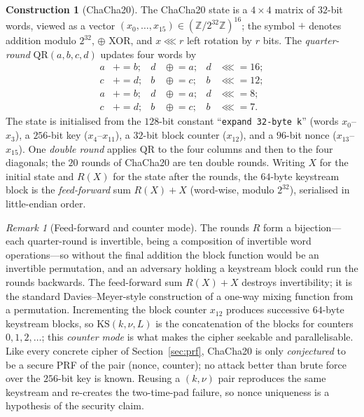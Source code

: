 \documentclass[11pt,a4paper]{article}
\theoremstyle{definition}
\newtheorem{construction}[theorem]{Construction}
\theoremstyle{remark}
\newtheorem{remark}[theorem]{Remark}
\newcommand{\Z}{\ensuremath{\mathbb{Z}}}
\begin{document}
\begin{construction}[ChaCha20]\label{symmetric:con-chacha}
The \textsf{ChaCha20} state is a \(4 \times 4\) matrix of \(32\)-bit
words, viewed as a vector
\((x_{0}, \dots, x_{15}) \in (\Z/2^{32}\Z)^{16}\); the symbol \(+\)
denotes addition modulo \(2^{32}\), \(\oplus\) XOR, and
\(x \lll r\) left rotation by \(r\) bits. The \emph{quarter-round}
\(\mathrm{QR}(a, b, c, d)\) updates four words by
\[
  \begin{aligned}
    a &\mathrel{+}= b; & d &\mathrel{\oplus}= a; & d &\lll= 16; \\
    c &\mathrel{+}= d; & b &\mathrel{\oplus}= c; & b &\lll= 12; \\
    a &\mathrel{+}= b; & d &\mathrel{\oplus}= a; & d &\lll= 8;  \\
    c &\mathrel{+}= d; & b &\mathrel{\oplus}= c; & b &\lll= 7.
  \end{aligned}
\]
The state is initialised from the \(128\)-bit constant
``\texttt{expand 32-byte k}'' (words \(x_{0}\)--\(x_{3}\)), a
\(256\)-bit key (\(x_{4}\)--\(x_{11}\)), a \(32\)-bit block counter
(\(x_{12}\)), and a \(96\)-bit nonce (\(x_{13}\)--\(x_{15}\)). One
\emph{double round} applies \(\mathrm{QR}\) to the four columns and
then to the four diagonals; the \(20\) rounds of \textsf{ChaCha20}
are ten double rounds. Writing \(X\) for the initial state and
\(R(X)\) for the state after the rounds, the \(64\)-byte keystream
block is the \emph{feed-forward} sum \(R(X) + X\) (word-wise, modulo
\(2^{32}\)), serialised in little-endian order.
\end{construction}

\begin{remark}[Feed-forward and counter mode]
\label{symmetric:rem-chacha-design}
The rounds \(R\) form a bijection---each quarter-round is invertible,
being a composition of invertible word operations---so without the
final addition the block function would be an invertible permutation,
and an adversary holding a keystream block could run the rounds
backwards. The feed-forward sum \(R(X) + X\) destroys invertibility;
it is the standard Davies--Meyer-style construction of a one-way
mixing function from a permutation. Incrementing the block counter
\(x_{12}\) produces successive \(64\)-byte keystream blocks, so
\(\mathrm{KS}(k, \nu, L)\) is the concatenation of the blocks for
counters \(0, 1, 2, \dots\); this \emph{counter mode} is what makes
the cipher seekable and parallelisable. Like every concrete cipher of
Section~\ref{sec:prf}, \textsf{ChaCha20} is only \emph{conjectured}
to be a secure PRF of the pair (nonce, counter); no attack better
than brute force over the \(256\)-bit key is known. Reusing a
\((k, \nu)\) pair reproduces the same keystream and re-creates the
two-time-pad failure, so nonce uniqueness is a hypothesis of the
security claim.
\end{remark}
\end{document}
